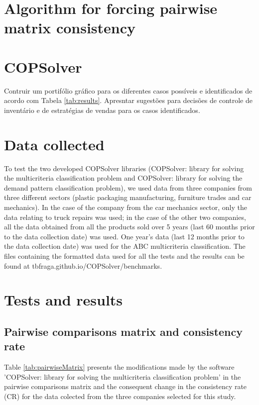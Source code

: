 \documentclass[authoryear,manuscript,12pt]{elsarticle}
\begin{document}
\section{Algorithm for forcing pairwise matrix consistency}

\section{COPSolver}

Contruir um portifólio gráfico para os diferentes casos possíveis e identificados de acordo com Tabela \ref{tab:results}. Apresntar sugestões para decisões de controle de inventário e de estratégias de vendas para os casos identificados.

\section{Data collected}
\label{sec:data}

To test the two developed COPSolver libraries (COPSolver: library for solving the multicriteria classification problem and COPSolver: library for solving the demand pattern classification problem), we used data from three companies from three different sectors (plastic packaging manufacturing, furniture trades and car mechanics). In the case of the company from the car mechanics sector, only the data relating to truck repairs was used; in the case of the other two companies, all the data obtained from all the products sold over 5 years (last 60 months prior to the data collection date) was used. One year's data (last 12 months prior to the data collection date) was used for the ABC multicriteria classification. The files containing the formatted data used for all the tests and the results can be found at tbfraga.github.io/COPSolver/benchmarks. 

\section{Tests and results}
\label{sec:results}

\subsection{Pairwise comparisons matrix and consistency rate}

Table \ref{tab:pairwiseMatrix} presents the modifications made by the software 'COPSolver: library for solving the multicriteria classification problem' in the pairwise comparisons matrix and the consequent change in the consistency rate (CR) for the data colected from the three companies selected for this study.
\end{document}
